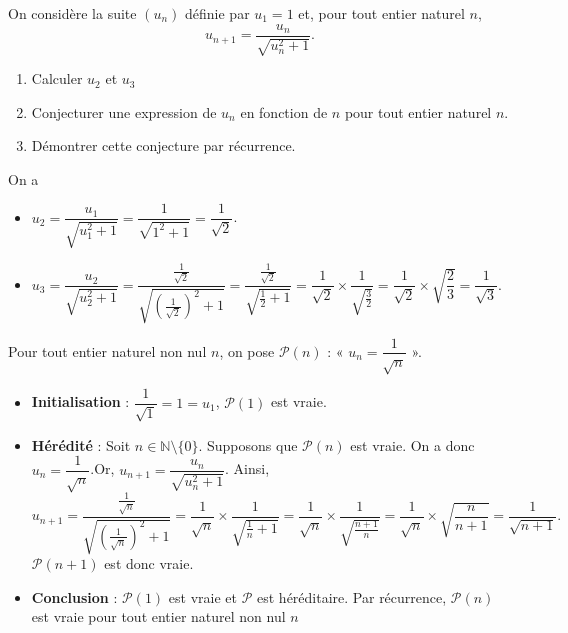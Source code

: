 \documentclass[11pt,fleqn]{book} %
\begin{document}
\begin{exercise}
On considère la suite \((u_n)\) définie par \(u_1=1\) et, pour tout entier naturel \(n\), \[u_{n+1}= \dfrac{u_n}{\sqrt{u_n^2+1}}.\]
\begin{enumerate}
 	\item Calculer \(u_2\) et \(u_3\)
 	\item Conjecturer une expression de \(u_n\) en fonction de \(n\) pour tout entier naturel $n$.
 	\item Démontrer cette conjecture par récurrence.
\end{enumerate}\end{exercise}
\begin{solution}On a
\begin{itemize}\item \( u_2 = \dfrac{u_1}{\sqrt{u_1^2+1}}=\dfrac{1}{\sqrt{1^2+1}}=\dfrac{1}{\sqrt{2}}\).
 	\item \( u_3 = \dfrac{u_2}{\sqrt{u_2^2+1}}=\dfrac{\frac{1}{\sqrt{2}}}{\sqrt{\left(\frac{1}{\sqrt{2}}\right)^2+1}}=\dfrac{\frac{1}{\sqrt{2}}}{\sqrt{\frac{1}{2}+1}}=\dfrac{1}{\sqrt{2}} \times \dfrac{1}{\sqrt{\frac{3}{2}}} = \dfrac{1}{\sqrt{2}} \times \sqrt{\dfrac{2}{3}} = \dfrac{1}{\sqrt{3}}\).
\end{itemize}
Pour tout entier naturel non nul \(n\), on pose \(\mathcal{P}(n)\) : « \(u_n=\dfrac{1}{\sqrt{n}}\) ».
\begin{itemize}
\item \textbf{Initialisation} : \( \dfrac{1}{\sqrt{1}}=1=u_1\), \( \mathcal{P}(1) \) est vraie.
\item \textbf{Hérédité} : Soit \(n\in\mathbb{N}\setminus \{0\}\). Supposons que \( \mathcal{P}(n)\) est vraie. On a donc \(u_n=\dfrac{1}{\sqrt{n}}\).Or, $u_{n+1}= \dfrac{u_n}{\sqrt{u_n^2+1}}$. Ainsi,
\[u_{n+1}= \dfrac{\frac{1}{\sqrt{n}}}{\sqrt{\left(\frac{1}{\sqrt{n}}\right)^2+1}}=\dfrac{1}{\sqrt{n}} \times \dfrac{1}{\sqrt{\frac{1}{n}+1}}=\dfrac{1}{\sqrt{n}} \times \dfrac{1}{\sqrt{\frac{n+1}{n}}}=\dfrac{1}{\sqrt{n}} \times \sqrt{\dfrac{n}{n+1}} = \dfrac{1}{\sqrt{n+1}}.\]\( \mathcal{P}(n+1)\) est donc vraie.
\item \textbf{Conclusion} : \(\mathcal{P}(1)\) est vraie et \(\mathcal{P}\) est héréditaire. Par récurrence, \(\mathcal{P}(n)\) est vraie pour tout entier naturel non nul \(n\)
\end{itemize}\end{solution}
\end{document}
